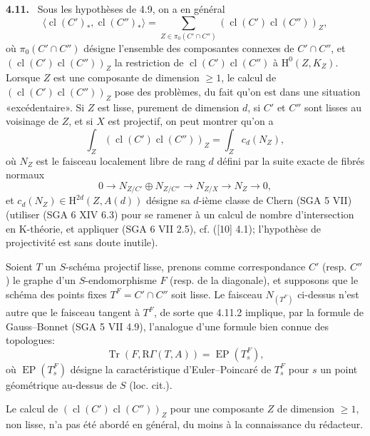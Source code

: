 \documentclass[11pt]{article}
\newenvironment{statement}[1]{\par\medskip\noindent\textbf{#1.}\ }{\par\medskip}
\renewcommand{\H}{\mathrm{H}}
\newcommand{\R}{\mathrm{R}}
\providecommand{\cl}{\operatorname{cl}}
\providecommand{\Tr}{\operatorname{Tr}}
\providecommand{\EP}{\operatorname{EP}}
\providecommand{\Tr}{\operatorname{Tr}}
\providecommand{\Tr}{\operatorname{Tr}}
\providecommand{\R}{\mathrm R}
\providecommand{\Tr}{\operatorname{Tr}}
\providecommand{\cl}{\operatorname{cl}}
\providecommand{\EP}{\operatorname{EP}}
\providecommand{\cl}{\operatorname{cl}}
\providecommand{\Tr}{\operatorname{Tr}}
\begin{document}
\begin{statement}{4.11}
Sous les hypothèses de 4.9, on a en général
\begin{equation}
\tag{4.11.1}
\langle \cl(C')_*,\cl(C'')_*\rangle
=
\sum_{Z\in\pi_0(C'\cap C'')}(\cl(C')\cl(C''))_Z,
\end{equation}
où $\pi_0(C'\cap C'')$ désigne l'ensemble des composantes connexes de $C'\cap C''$, et $(\cl(C')\cl(C''))_Z$ la restriction de $\cl(C')\cl(C'')$ à $\H^0(Z,K_Z)$. Lorsque $Z$ est une composante de dimension $\geq 1$, le calcul de $(\cl(C')\cl(C''))_Z$ pose des problèmes, du fait qu'on est dans une situation «excédentaire». Si $Z$ est lisse, purement de dimension $d$, si $C'$ et $C''$ sont lisses au voisinage de $Z$, et si $X$ est projectif, on peut montrer qu'on a
\begin{equation}
\tag{4.11.2}
\int_Z(\cl(C')\cl(C''))_Z=\int_Z c_d(N_Z),
\end{equation}
où $N_Z$ est le faisceau localement libre de rang $d$ défini par la suite exacte de fibrés normaux
\[
0\longrightarrow N_{Z/C'}\oplus N_{Z/C''}\longrightarrow N_{Z/X}\longrightarrow N_Z\longrightarrow 0,
\]
et $c_d(N_Z)\in \H^{2d}(Z,A(d))$ désigne sa $d$-ième classe de Chern (SGA 5 VII) (utiliser (SGA 6 XIV 6.3) pour se ramener à un calcul de nombre d'intersection en K-théorie, et appliquer (SGA 6 VII 2.5), cf. ([10] 4.1); l'hypothèse de projectivité est sans doute inutile).

Soient $T$ un $S$-schéma projectif lisse, prenons comme correspondance $C'$ (resp. $C''$) le graphe d'un $S$-endomorphisme $F$ (resp. de la diagonale), et supposons que le schéma des points fixes $T^F=C'\cap C''$ soit lisse. Le faisceau $N_{(T^F)}$ ci-dessus n'est autre que le faisceau tangent à $T^F$, de sorte que 4.11.2 implique, par la formule de Gauss--Bonnet (SGA 5 VII 4.9), l'analogue d'une formule bien connue des topologues:
\begin{equation}
\tag{4.11.3}
\Tr(F,\R\Gamma(T,A))=\EP(T_s^F),
\end{equation}
où $\EP(T_s^F)$ désigne la caractéristique d'Euler--Poincaré de $T_s^F$ pour $s$ un point géométrique au-dessus de $S$ (loc. cit.).
\end{statement}

Le calcul de $(\cl(C')\cl(C''))_Z$ pour une composante $Z$ de dimension $\geq 1$, non lisse, n'a pas été abordé en général, du moins à la connaissance du rédacteur.
\end{document}
